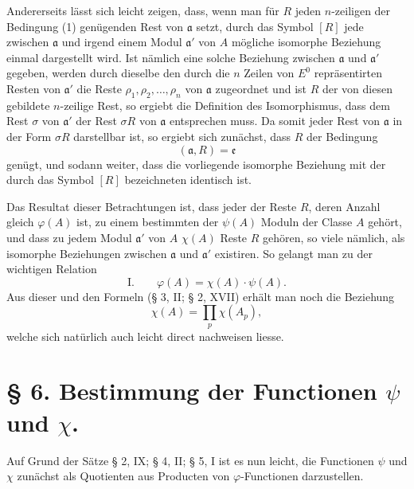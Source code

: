 Andererseits lässt sich leicht zeigen, dass, wenn man für $R$ jeden $n$-zeiligen der Bedingung (1) genügenden Rest von $\mathfrak a$ setzt, durch das Symbol $[R]$ jede zwischen $\mathfrak a$ und irgend einem Modul $\mathfrak a'$ von $A$ mögliche isomorphe Beziehung einmal dargestellt wird. Ist nämlich eine solche Beziehung zwischen $\mathfrak a$ und $\mathfrak a'$ gegeben, werden durch dieselbe den durch die $n$ Zeilen von $E^0$ repräsentirten Resten von $\mathfrak a'$ die Reste $\rho_1,\rho_2,\ldots,\rho_n$ von $\mathfrak a$ zugeordnet und ist $R$ der von diesen gebildete $n$-zeilige Rest, so ergiebt die Definition des Isomorphismus, dass dem Rest $\sigma$ von $\mathfrak a'$ der Rest $\sigma R$ von $\mathfrak a$ entsprechen muss. Da somit jeder Rest von $\mathfrak a$ in der Form $\sigma R$ darstellbar ist, so ergiebt sich zunächst, dass $R$ der Bedingung
\[
 (\mathfrak a,R)=\mathfrak e
\]
genügt, und sodann weiter, dass die vorliegende isomorphe Beziehung mit der durch das Symbol $[R]$ bezeichneten identisch ist.

Das Resultat dieser Betrachtungen ist, dass jeder der Reste $R$, deren Anzahl gleich $\varphi(A)$ ist, zu einem bestimmten der $\psi(A)$ Moduln der Classe $A$ gehört, und dass zu jedem Modul $\mathfrak a'$ von $A$ $\chi(A)$ Reste $R$ gehören, so viele nämlich, als isomorphe Beziehungen zwischen $\mathfrak a$ und $\mathfrak a'$ existiren. So gelangt man zu der wichtigen Relation
\[
\text{I.}\qquad \varphi(A)=\chi(A)\cdot\psi(A).
\]
Aus dieser und den Formeln (§ 3, II; § 2, XVII) erhält man noch die Beziehung
\[
 \chi(A)=\prod_p \chi(A_p),
\]
welche sich natürlich auch leicht direct nachweisen liesse.

\section*{§ 6. Bestimmung der Functionen $\psi$ und $\chi$.}

Auf Grund der Sätze § 2, IX; § 4, II; § 5, I ist es nun leicht, die Functionen $\psi$ und $\chi$ zunächst als Quotienten aus Producten von $\varphi$-Functionen darzustellen.

